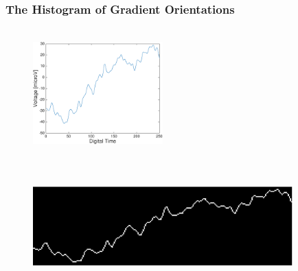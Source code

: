\documentclass[aspectratio=169]{beamer}
\begin{document}
\begin{frame}
\frametitle{The Histogram of Gradient Orientations}
\begin{center}
\begin{figure}[htb]
\centering
\includegraphics[height=5cm,width=5cm]{images/plotvsimage.eps}
\includegraphics[height=5cm,width=10cm]{images/sampleplot.eps}
\label{fig:plotvsimage}
\end{figure}
\end{center}
\end{frame}
\end{document}
